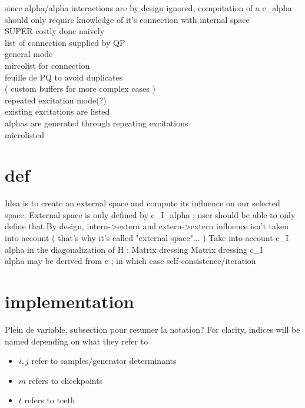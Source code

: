 \documentclass[./thesis.tex]{subfiles}
\begin{document}
since alpha/alpha interactions are by design ignored, computation of a c\_alpha should only require knowledge of it's connection with internal space \\
SUPER costly done naively \\
list of connection supplied by QP \\
general mode \\
mircolist for connection \\
feuille de PQ to avoid duplicates \\
( custom buffers for more complex cases ) \\
repeated excitation mode(?)  \\
existing excitations are listed \\
alphas are generated through repeating excitations \\

microlisted \\
\section{def}
Idea is to create an external space and compute its influence on our selected space.
External space is only defined by c\_I\_alpha ; user should be able to only define that
By design, intern->extern and extern->extern influence isn't taken into account ( that's why it's called "external space"... )
Take into account c\_I\\alpha in the diagonalization of H : Matrix dressing
Matrix dressing
c\_I\\alpha may be derived from c ; in which case self-consistence/iteration


\section{implementation}
Plein de variable, subsection pour resumer la notation?
For clarity, indices will be named depending on what they refer to
\begin{itemize}
\item
$i,j$ refer to samples/generator determinants
\item
$m$ refers to checkpoints
\item
$t$ refers to teeth
\end{itemize}
\end{document}
